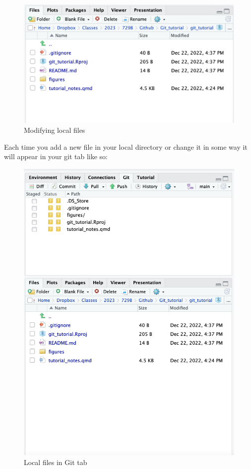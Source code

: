 \documentclass[
  letterpaper,
  DIV=11,
  numbers=noendperiod]{scrartcl}
\begin{document}
\begin{figure}

{\centering \includegraphics{figures/10.PNG}

}

\caption{Modifying local files}

\end{figure}

Each time you add a new file in your local directory or change it in
some way it will appear in your git tab like so:

\begin{figure}

{\centering \includegraphics{figures/11.PNG}

}

\caption{Local files in Git tab}

\end{figure}
\end{document}
